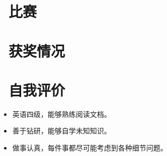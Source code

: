 \documentclass{resume}
\begin{document}
\section{\faHeartO\ 比赛}

\section{\faHeartO\ 获奖情况}

\section{\faInfo\ 自我评价}
\begin{itemize}[parsep=0.5ex]
  \item 英语四级，能够熟练阅读文档。
  \item 善于钻研，能够自学未知知识。
  \item 做事认真，每件事都尽可能考虑到各种细节问题。
\end{itemize}

%
%
\end{document}
